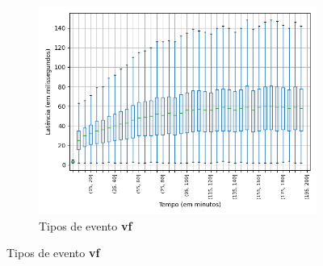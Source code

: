 \begin{figure}
\centering
\begin{subfigure}{.5\textwidth}
\centering
\includegraphics[width=\textwidth]{figuras/graphics/boxplot_8-dez-su_vf.png}
\caption{Tipos de evento \textbf{vf}}
\label{fig:BoxPlot_vf_SU_8-dez-su}
\end{subfigure}%


\end{figure}
